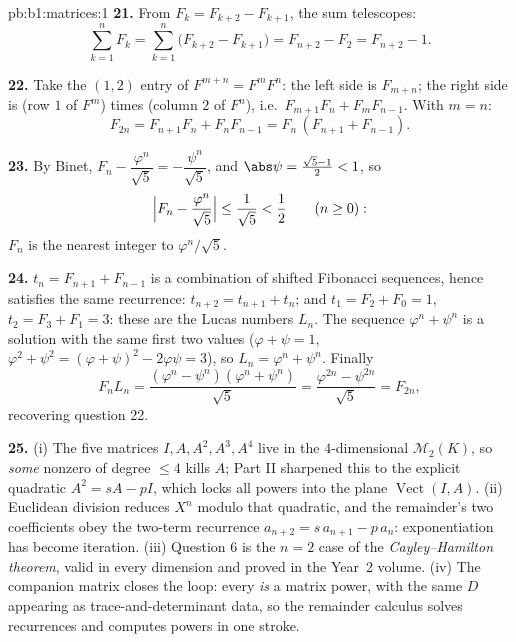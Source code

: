 \begin{solution}{pb:b1:matrices:1}
\textbf{21.} From $F_k = F_{k+2} - F_{k+1}$, the sum telescopes:
\[
\sum_{k=1}^{n} F_k = \sum_{k=1}^{n}\bigl(F_{k+2} - F_{k+1}\bigr)
= F_{n+2} - F_2 = F_{n+2} - 1 .
\]

\textbf{22.} Take the $(1,2)$ entry of $F^{m+n} = F^m F^n$: the
left side is $F_{m+n}$; the right side is (row $1$ of $F^m$)
times (column $2$ of $F^n$), i.e.\ $F_{m+1}F_n + F_m F_{n-1}$.
With $m = n$:
\[
F_{2n} = F_{n+1}F_n + F_nF_{n-1} = F_n\,(F_{n+1} + F_{n-1}).
\]

\textbf{23.} By Binet, $F_n - \dfrac{\varphi^n}{\sqrt5} =
-\dfrac{\psi^n}{\sqrt5}$, and $\abs\psi = \frac{\sqrt5 - 1}2 <
1$, so
\[
\Bigl|F_n - \frac{\varphi^n}{\sqrt5}\Bigr|
\leq \frac{1}{\sqrt5} < \frac12
\qquad (n \geq 0):
\]
$F_n$ is the nearest integer to $\varphi^n/\sqrt5$.

\textbf{24.} $t_n = F_{n+1} + F_{n-1}$ is a combination of
shifted Fibonacci sequences, hence satisfies the same
recurrence: $t_{n+2} = t_{n+1} + t_n$; and $t_1 = F_2 + F_0 =
1$, $t_2 = F_3 + F_1 = 3$: these are the Lucas numbers $L_n$.
The sequence $\varphi^n + \psi^n$ is a solution with the same
first two values ($\varphi + \psi = 1$, $\varphi^2 + \psi^2 = (
\varphi + \psi)^2 - 2\varphi\psi = 3$), so $L_n = \varphi^n +
\psi^n$. Finally
\[
F_n L_n = \frac{(\varphi^n - \psi^n)(\varphi^n +
\psi^n)}{\sqrt5} = \frac{\varphi^{2n} - \psi^{2n}}{\sqrt5} =
F_{2n},
\]
recovering question 22.

\textbf{25.} (i) The five matrices $I, A, A^2, A^3, A^4$ live in
the $4$-dimensional $\mathcal{M}_2(K)$, so \emph{some} nonzero
 of degree $\leq 4$ kills $A$; Part II sharpened this
to the explicit quadratic $A^2 = sA - pI$, which locks all
powers into the plane $\operatorname{Vect}(I, A)$. (ii)
Euclidean division reduces $X^n$ modulo that quadratic, and the
remainder's two coefficients obey the two-term recurrence
$a_{n+2} = s\,a_{n+1} - p\,a_n$: exponentiation has become
iteration. (iii) Question 6 is the $n = 2$ case of the
\emph{Cayley--Hamilton theorem}, valid in every dimension and
proved in the Year~2 volume. (iv) The companion matrix closes
the loop: every  \emph{is} a matrix power, with
the same  $D$ appearing as trace-and-determinant data,
so the remainder calculus solves recurrences and computes powers
in one stroke.
\end{solution}
